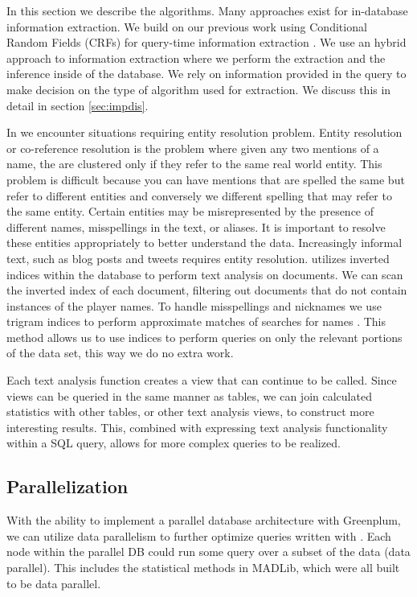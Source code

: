 In this section we describe the {\system} algorithms.
Many approaches exist for in-database information extraction. 
We build on our previous work using Conditional Random Fields (CRFs) for 
query-time information extraction \cite{wang2011hybrid}.
We use an hybrid approach to information extraction where we perform the 
extraction and the inference inside of the database. We rely on information
provided in the query to make decision on the type of algorithm used 
for extraction. 
We discuss this in detail in section \ref{sec:impdis}.

In {\system} we encounter situations requiring entity resolution problem.
Entity resolution or co-reference resolution is the problem where given any two
mentions of a name, the are clustered only if they refer to the same real 
world entity. This problem is difficult because you can have mentions that are
spelled the same but refer to different entities and conversely we different
spelling that may refer to the same entity.
Certain entities may be misrepresented by the presence of different names, 
misspellings in the text, or aliases. It is important to
resolve these entities appropriately to better understand the data. Increasingly
informal text, such as blog posts and tweets requires entity resolution. 
{\system} utilizes inverted indices within the database to perform text
analysis on documents. We can scan the inverted index of each 
document, filtering out documents that do not contain instances of the player names.
To handle misspellings and nicknames we use trigram indices to perform 
approximate matches of searches for names \cite{Jain:2009:BQO:1519103.1519108}.
This method allows us to use indices to perform queries on only the relevant
portions of the data set, this way we do no extra work.

Each text analysis function creates a view that can continue to be called.
Since views can be queried in the same manner as tables, we can join calculated
statistics with other tables, or other text analysis views, to construct more
interesting results. This, combined with expressing text analysis functionality
within a SQL query, allows for more complex queries to be realized. 



\subsection{Parallelization}
With the ability to implement a parallel database architecture with %
Greenplum, we can utilize data parallelism to further optimize queries written
with {\system}. Each node within the parallel DB could run some query
over a subset of the data (data parallel). This includes the statistical methods
in MADLib, which were all built to be data parallel.

